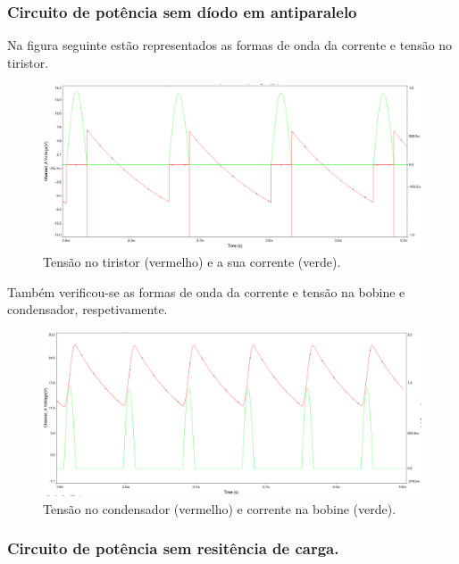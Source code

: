 \documentclass[a4paper,11pt]{article}
\numberwithin{equation}{section}
\begin{document}
 \pagebreak
 
\subsubsection{Circuito de potência sem díodo em antiparalelo}
 Na figura seguinte estão representados as formas de onda da corrente e tensão no tiristor.
 
  \begin{figure}[h]
  	\centering
  	\includegraphics[keepaspectratio=true, scale=0.365]{img/sim/tiristorsemdiodo}
  	\caption{Tensão no tiristor (vermelho) e a sua corrente (verde).}
  	\label{fig:ondbobine}
  	\vspace{-0.8em}
  \end{figure}
  
 Também verificou-se as formas de onda da corrente e tensão na bobine e condensador, respetivamente.
 
  \begin{figure}[h]
  	\centering
  	\includegraphics[keepaspectratio=true, scale=0.365]{img/sim/semdiodocond}
  	\caption{Tensão no condensador (vermelho) e corrente na bobine (verde).}
  	\label{fig:bobine}
  	\vspace{-0.8em}
  \end{figure}

\pagebreak

\subsubsection{Circuito de potência sem resitência de carga.}
\end{document}
